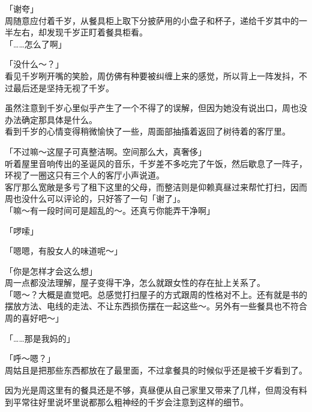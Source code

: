 「谢夸」\\

周随意应付着千岁，从餐具柜上取下分披萨用的小盘子和杯子，递给千岁其中的一半左右，却发现千岁正盯着餐具柜看。\\

「……怎么了啊」

「没什么～？」\\

看见千岁咧开嘴的笑脸，周仿佛有种要被纠缠上来的感觉，所以背上一阵发抖，不过最后还是坚持无视了千岁。

虽然注意到千岁心里似乎产生了一个不得了的误解，但因为她没有说出口，周也没办法确定那具体是什么。\\

看到千岁的心情变得稍微愉快了一些，周面部抽搐着返回了树待着的客厅里。\\

\vspace{2\baselineskip}

「不过嘛～这屋子可真整洁啊。空间那么大，真奢侈」\\

听着屋里音响传出的圣诞风的音乐，千岁差不多吃完了午饭，然后歇息了一阵子，环视了一圈这只有三个人的客厅小声说道。\\

客厅那么宽敞是多亏了租下这里的父母，而整洁则是仰赖真昼过来帮忙打扫，因而周也没什么可以评论的，只好答了一句「谢了」。\\

「嘛～有一段时间可是超乱的～。还真亏你能弄干净啊」

「啰嗦」

「嗯嗯，有股女人的味道呢～」

「你是怎样才会这么想」\\

周一点都没法理解，屋子变得干净，怎么就跟女性的存在扯上关系了。\\

「嗯～？大概是直觉吧。总感觉打扫屋子的方式跟周的性格对不上。还有就是书的摆放方法、电线的走法、不让东西损伤摆在一起这些～。另外有一些餐具也不符合周的喜好吧～」

「……那是我妈的」

「呼～嗯？」\\

周姑且是把那些东西都放在了最里面，不过拿餐具的时候似乎还是被千岁看到了。

因为光是周这里有的餐具还是不够，真昼便从自己家里又带来了几样，但周没有料到平常往好里说坏里说都那么粗神经的千岁会注意到这样的细节。\\

